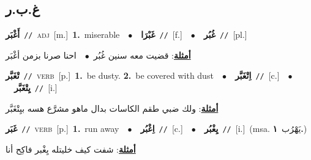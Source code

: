 \documentclass[10pt,a4paper,twoside]{article} %
\begin{document}
\begin{multicols}{2}
\vspace{-3mm}
\subsection*{\color{blue}\foreignlanguage{arabic}{غ.ب.ر}\color{blue}{}} 

{\setlength\topsep{0pt}\textbf{\foreignlanguage{arabic}{أَغْبَر}}\ {\color{gray}\texttt{//}\color{black}}\ \textsc{adj}\ [m.]\ \textbf{1.}~miserable\ \ $\bullet$\ \ \setlength\topsep{0pt}\textbf{\foreignlanguage{arabic}{غَبْرَا}}\ {\color{gray}\texttt{//}\color{black}}\ [f.]\ \ $\bullet$\ \ \setlength\topsep{0pt}\textbf{\foreignlanguage{arabic}{غُبُر}}\ {\color{gray}\texttt{//}\color{black}}\ [pl.]\  \begin{flushright}\color{gray}\foreignlanguage{arabic}{\textbf{\underline{\foreignlanguage{arabic}{أمثلة}}}: قضيت معه سنين غُبُر\ $\bullet$\ \  احنا صرنا بزمن أغْبَر}\end{flushright}\color{black}} \vspace{2mm}

{\setlength\topsep{0pt}\textbf{\foreignlanguage{arabic}{تْغَبَّر}}\ {\color{gray}\texttt{//}\color{black}}\ \textsc{verb}\ [p.]\ \textbf{1.}~be dusty.  \textbf{2.}~be covered with dust\ \ $\bullet$\ \ \setlength\topsep{0pt}\textbf{\foreignlanguage{arabic}{اِتْغَبَّر}}\ {\color{gray}\texttt{//}\color{black}}\ [c.]\ \ $\bullet$\ \ \setlength\topsep{0pt}\textbf{\foreignlanguage{arabic}{يِتْغَبَّر}}\ {\color{gray}\texttt{//}\color{black}}\ [i.]\  \begin{flushright}\color{gray}\foreignlanguage{arabic}{\textbf{\underline{\foreignlanguage{arabic}{أمثلة}}}: ولك ضبي طقم الكاسات بدال ماهو مشرَّع هسه بيِتْغَبَّر}\end{flushright}\color{black}} \vspace{2mm}

{\setlength\topsep{0pt}\textbf{\foreignlanguage{arabic}{غَبَر}}\ {\color{gray}\texttt{//}\color{black}}\ \textsc{verb}\ [p.]\ \textbf{1.}~run away\ \ $\bullet$\ \ \setlength\topsep{0pt}\textbf{\foreignlanguage{arabic}{اِغْبُر}}\ {\color{gray}\texttt{//}\color{black}}\ [c.]\ \ $\bullet$\ \ \setlength\topsep{0pt}\textbf{\foreignlanguage{arabic}{يِغْبُر}}\ {\color{gray}\texttt{//}\color{black}}\ [i.]\ \color{gray}(msa. \foreignlanguage{arabic}{يَهْرُب}~\foreignlanguage{arabic}{\textbf{١.}})\color{black}\  \begin{flushright}\color{gray}\foreignlanguage{arabic}{\textbf{\underline{\foreignlanguage{arabic}{أمثلة}}}: شفت كيف خليتله يِغْبر فاكِح أنا}\end{flushright}\color{black}} \vspace{2mm}


\end{multicols}
\end{document}
